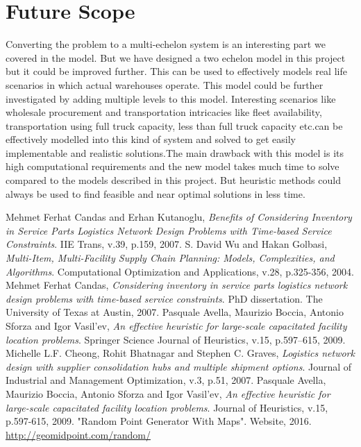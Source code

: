 \documentclass[12pt]{article}
\numberwithin{equation}{section}
\begin{document}
\section{Future Scope}
Converting the problem to a multi-echelon system is an interesting part we covered in the model. But we have designed a two echelon model in this project but it could be improved further. This can be used to effectively models real life scenarios in which actual warehouses operate. This model could be further investigated by adding multiple levels to this model. Interesting scenarios like wholesale procurement and transportation intricacies like fleet availability, transportation using full truck capacity, less than full truck capacity etc.can be effectively modelled into this kind of system and solved to get easily implementable and realistic solutions.The main drawback with this model is its high computational requirements and the new model takes much time to solve compared to the models described in this project. But heuristic methods could always be used to find feasible and near optimal solutions in less time.
\newpage
{}
\begin{thebibliography}{99}
 Mehmet Ferhat Candas and Erhan Kutanoglu, {\em Benefits of Considering Inventory in Service Parts Logistics Network Design Problems with Time-based Service Constraints}. IIE Trans, v.39, p.159, 2007.
 S. David Wu and Hakan Golbasi, {\em Multi-Item, Multi-Facility Supply Chain Planning: Models, Complexities, and Algorithms}. Computational Optimization and Applications, v.28, p.325-356, 2004.
 Mehmet Ferhat Candas, {\em Considering inventory in service parts logistics network design problems with time-based service constraints}. PhD dissertation. The University of Texas at Austin, 2007.
 Pasquale Avella, Maurizio Boccia, Antonio Sforza and Igor Vasil’ev, {\em An effective heuristic for large-scale capacitated facility location problems}. Springer Science Journal of Heuristics, v.15, p.597–615, 2009.
 Michelle L.F. Cheong, Rohit Bhatnagar and Stephen C. Graves, {\em Logistics network design with supplier consolidation hubs and multiple shipment options}. Journal of Industrial and Management Optimization, v.3, p.51, 2007.
 Pasquale Avella, Maurizio Boccia, Antonio Sforza and Igor Vasil’ev, {\em An effective heuristic for large-scale capacitated facility location problems}. Journal of Heuristics, v.15, p.597-615, 2009.
 "Random Point Generator With Maps". Website, 2016. \url{http://geomidpoint.com/random/}
\end{thebibliography}
\newpage
\appendix
{}
\end{document}
